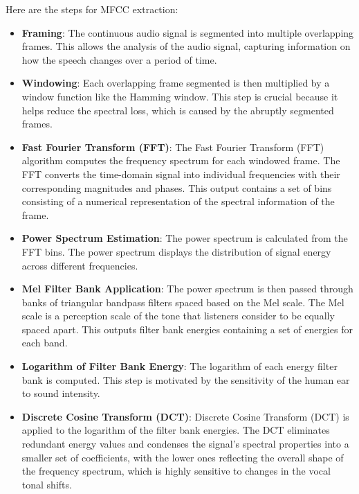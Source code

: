\documentclass[iicol,sn-mathphys-num]{sn-jnl}%
\theoremstyle{thmstyleone}%
\theoremstyle{thmstyletwo}%
\theoremstyle{thmstylethree}%
\begin{document}
\begin{enumerate}
\iffalse 
\noindent Here are the steps for MFCC extraction:
    \begin{itemize}
    
    \item \textbf{Framing}: The continuous audio signal is segmented into multiple overlapping frames. This allows the analysis of the audio signal, capturing information on how the speech changes over a period of time.
    
    \item \textbf{Windowing}: Each overlapping frame segmented is then multiplied by a window function like the Hamming window. This step is crucial because it helps reduce the spectral loss, which is caused by the abruptly segmented frames.
    
    \item \textbf{Fast Fourier Transform (FFT)}: The Fast Fourier Transform (FFT) algorithm computes the frequency spectrum for each windowed frame. The FFT converts the time-domain signal into individual frequencies with their corresponding magnitudes and phases. This output contains a set of bins consisting of a numerical representation of the spectral information of the frame.

    \item \textbf{Power Spectrum Estimation}: The power spectrum is calculated from the FFT bins. The power spectrum displays the distribution of signal energy across different frequencies.

    \item \textbf{Mel Filter Bank Application}: The power spectrum is then passed through banks of triangular bandpass filters spaced based on the Mel scale. The Mel scale is a perception scale of the tone that listeners consider to be equally spaced apart. This outputs filter bank energies containing a set of energies for each band.

    \item \textbf{Logarithm of Filter Bank Energy}: The logarithm of each energy filter bank is computed. This step is motivated by the sensitivity of the human ear to sound intensity.

    \item \textbf{Discrete Cosine Transform (DCT)}: Discrete Cosine Transform (DCT) is applied to the logarithm of the filter bank energies. The DCT eliminates redundant energy values and condenses the signal's spectral properties into a smaller set of coefficients, with the lower ones reflecting the overall shape of the frequency spectrum, which is highly sensitive to changes in the vocal tonal shifts.


\end{itemize}
\end{enumerate}
\end{document}
